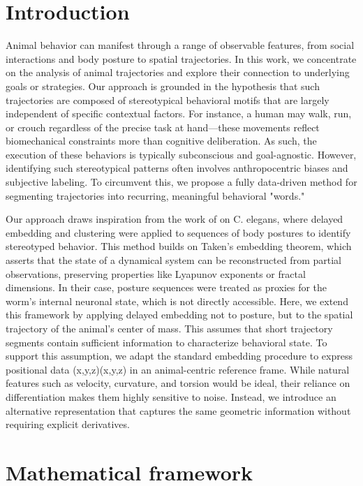 \section{Introduction}

Animal behavior can manifest through a range of observable features, from social interactions and body posture to spatial trajectories. In this work, we concentrate on the analysis of animal trajectories and explore their connection to underlying goals or strategies. Our approach is grounded in the hypothesis that such trajectories are composed of stereotypical behavioral motifs that are largely independent of specific contextual factors. For instance, a human may walk, run, or crouch regardless of the precise task at hand—these movements reflect biomechanical constraints more than cognitive deliberation. As such, the execution of these behaviors is typically subconscious and goal-agnostic. However, identifying such stereotypical patterns often involves anthropocentric biases and subjective labeling. To circumvent this, we propose a fully data-driven method for segmenting trajectories into recurring, meaningful behavioral "words."

Our approach draws inspiration from the work of \cite{costaMarkovianDynamicsCaenorhabditis2024} on C. elegans, where delayed embedding and clustering were applied to sequences of body postures to identify stereotyped behavior. This method builds on Taken's embedding theorem, which asserts that the state of a dynamical system can be reconstructed from partial observations, preserving properties like Lyapunov exponents or fractal dimensions. In their case, posture sequences were treated as proxies for the worm's internal neuronal state, which is not directly accessible. Here, we extend this framework by applying delayed embedding not to posture, but to the spatial trajectory of the animal's center of mass. This assumes that short trajectory segments contain sufficient information to characterize behavioral state. To support this assumption, we adapt the standard embedding procedure to express positional data (x,y,z)(x,y,z) in an animal-centric reference frame. While natural features such as velocity, curvature, and torsion would be ideal, their reliance on differentiation makes them highly sensitive to noise. Instead, we introduce an alternative representation that captures the same geometric information without requiring explicit derivatives.


\section{Mathematical framework}

